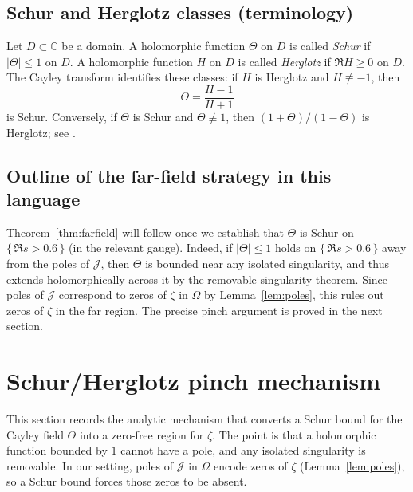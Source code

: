 \documentclass[11pt]{amsart}
\theoremstyle{definition}
\theoremstyle{remark}
\newcommand{\C}{\mathbb{C}}
\begin{document}
\subsection*{Schur and Herglotz classes (terminology)}
Let $D\subset\C$ be a domain. A holomorphic function $\Theta$ on $D$ is called \emph{Schur} if $|\Theta|\le 1$ on $D$.
A holomorphic function $H$ on $D$ is called \emph{Herglotz} if $\Re H\ge 0$ on $D$.
The Cayley transform identifies these classes: if $H$ is Herglotz and $H\not\equiv -1$, then
\[
  \Theta=\frac{H-1}{H+1}
\]
is Schur. Conversely, if $\Theta$ is Schur and $\Theta\not\equiv 1$, then $(1+\Theta)/(1-\Theta)$ is Herglotz;
see \cite{Donoghue,RosenblumRovnyak}.

\subsection*{Outline of the far-field strategy in this language}
Theorem~\ref{thm:farfield} will follow once we establish that $\Theta$ is Schur on $\{\,\Re s>0.6\,\}$ (in the relevant gauge).
Indeed, if $|\Theta|\le 1$ holds on $\{\,\Re s>0.6\,\}$ away from the poles of $\mathcal J$, then $\Theta$ is bounded near any
isolated singularity, and thus extends holomorphically across it by the removable singularity theorem.
Since poles of $\mathcal J$ correspond to zeros of $\zeta$ in $\Omega$ by Lemma~\ref{lem:poles}, this rules out zeros of $\zeta$
in the far region. The precise pinch argument is proved in the next section.

\section{Schur/Herglotz pinch mechanism}\label{sec:pinch}
\par\noindent
This section records the analytic mechanism that converts a Schur bound for the Cayley field $\Theta$
into a zero-free region for $\zeta$.
The point is that a holomorphic function bounded by $1$ cannot have a pole, and any isolated singularity is removable.
In our setting, poles of $\mathcal J$ in $\Omega$ encode zeros of $\zeta$ (Lemma~\ref{lem:poles}), so a Schur bound forces those zeros to be absent.
\end{document}
